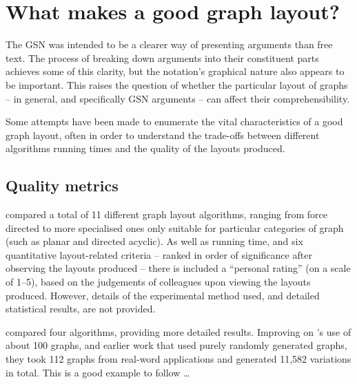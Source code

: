 \section{What makes a good graph layout?}

The GSN was intended to be a clearer way of presenting arguments than free text.
The process of breaking down arguments into their constituent parts achieves some of this clarity,
but the notation's graphical nature also appears to be important.
This raises the question of whether the particular layout of graphs -- in general, and specifically GSN arguments -- can affect their comprehensibility.

Some attempts have been made to enumerate the vital characteristics of a good graph layout, often in order to understand the trade-offs between different algorithms running times and the quality of the layouts produced.


\subsection{Quality metrics}

\citet{Himsolt95comparingand} compared a total of 11 different graph layout algorithms, ranging from force directed to more specialised ones only suitable for particular categories of graph (such as planar and directed acyclic).
As well as running time, and six quantitative layout-related criteria -- ranked in order of significance after observing the layouts produced -- there is included a ``personal rating'' (on a scale of 1--5), based on the judgements of colleagues upon viewing the layouts produced.
However, details of the experimental method used, and detailed statistical results, are not provided.

\citet{DiBattista1997303} compared four algorithms, providing more detailed results.
Improving on \citeauthor{Himsolt95comparingand}'s use of about 100 graphs, and earlier work  that used purely randomly generated graphs, they took 112 graphs from real-word applications and generated 11,582 variations in total. This is a good example to follow \ldots


